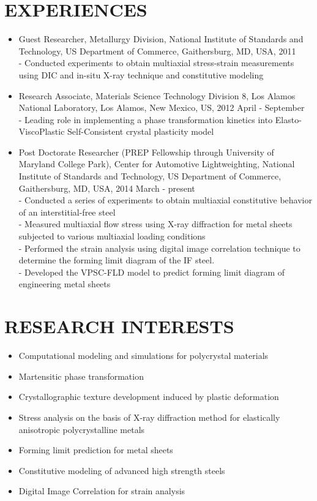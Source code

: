 \documentclass{res}
\begin{document}
\begin{resume}
  \section{EXPERIENCES}
  \begin{itemize}
  \item Guest Researcher, Metallurgy Division, National Institute of
    Standards and Technology, US Department of Commerce, Gaithersburg,
    MD, USA, 2011\\
    - Conducted experiments to obtain multiaxial stress-strain measurements
    using DIC and in-situ X-ray technique and constitutive modeling
  \item Research Associate, Materials Science Technology Division 8, Los Alamos
    National Laboratory, Los Alamos, New Mexico, US, 2012 April - September \\
    - Leading role in implementing a phase transformation kinetics into Elasto-ViscoPlastic Self-Consistent crystal plasticity model
  \item Post Doctorate Researcher (PREP Fellowship through University of Maryland College Park), Center for Automotive Lightweighting,
    National Institute of Standards and Technology, US Department of Commerce, Gaithersburg, MD, USA, 2014 March - present\\
    - Conducted a series of experiments to obtain multiaxial constitutive behavior of an interstitial-free steel\\
    - Measured multiaxial flow stress using X-ray diffraction for metal sheets subjected to various multiaxial loading conditions\\
    - Performed the strain analysis using digital image correlation technique to determine the forming limit diagram of the IF steel.\\
    - Developed the VPSC-FLD model to predict forming limit diagram of engineering metal sheets\\
  \end{itemize}

  \section{RESEARCH INTERESTS}
  \begin{itemize}
  \item Computational modeling and simulations for polycrystal materials
  \item Martensitic phase transformation
  \item Crystallographic texture development induced by plastic deformation
  \item Stress analysis on the basis of X-ray diffraction method for elastically anisotropic polycrystalline metals
  \item Forming limit prediction for metal sheets
  \item Constitutive modeling of advanced high strength steels
  \item Digital Image Correlation for strain analysis
  \end{itemize}




\end{resume}
\end{document}
